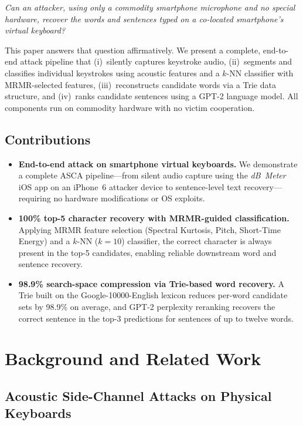\documentclass[conference]{IEEEtran}
\begin{document}
\medskip
\noindent\textit{Can an attacker, using only a commodity smartphone microphone and no special hardware, recover the words and sentences typed on a co-located smartphone's virtual keyboard?}
\medskip

This paper answers that question affirmatively. We present a complete, end-to-end attack pipeline that (i)~silently captures keystroke audio, (ii)~segments and classifies individual keystrokes using acoustic features and a $k$-NN classifier with MRMR-selected features, (iii)~reconstructs candidate words via a Trie data structure, and (iv)~ranks candidate sentences using a GPT-2 language model. All components run on commodity hardware with no victim cooperation.

\subsection*{Contributions}
\begin{itemize}
  \item \textbf{End-to-end attack on smartphone virtual keyboards.} We demonstrate a complete ASCA pipeline---from silent audio capture using the \textit{dB~Meter} iOS app on an iPhone~6 attacker device to sentence-level text recovery---requiring no hardware modifications or OS exploits.
  \item \textbf{100\% top-5 character recovery with MRMR-guided classification.} Applying MRMR feature selection (Spectral Kurtosis, Pitch, Short-Time Energy) and a $k$-NN ($k{=}10$) classifier, the correct character is always present in the top-5 candidates, enabling reliable downstream word and sentence recovery.
  \item \textbf{98.9\% search-space compression via Trie-based word recovery.} A Trie built on the Google-10000-English lexicon reduces per-word candidate sets by 98.9\% on average, and GPT-2 perplexity reranking recovers the correct sentence in the top-3 predictions for sentences of up to twelve words.
\end{itemize}

\section{Background and Related Work}

\subsection{Acoustic Side-Channel Attacks on Physical Keyboards}
\end{document}
